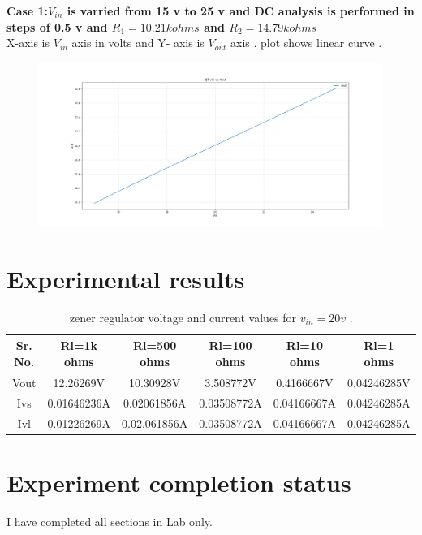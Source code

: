 \documentclass[12pt]{article}
\begin{document}
\textbf{Case 1:\(V_{in}\) is varried from 15 v to 25 v and DC analysis is performed in steps of 0.5 v and \(R_{1}=10.21 k ohms\) and \(R_{2}=14.79 k ohms\) \\}
X-axis is \(V_{in}\) axis in volts and Y- axis is \(V_{out}\) axis . plot shows linear curve .\\
\begin{figure}[h!]
\centering
\includegraphics[scale = 0.3]{BJT_vin_vout.png}
\end{figure}
\newpage

\section{Experimental results}
\begin{table}[!hbt]
		\begin{center}
		\caption{zener regulator voltage and current values for \(v_{in}=20v\) .}
		\begin{tabular}{|c|c|c|c|c|c}
			\hline
			Sr. No. & Rl=1k ohms & Rl=500 ohms & Rl=100 ohms & Rl=10 ohms & Rl=1 ohms\\
			\hline
			Vout & 12.26269V  & 10.30928V & 3.508772V & 0.4166667V & 0.04246285V \\
			\hline
			Ivs & 0.01646236A & 0.02061856A & 0.03508772A & 0.04166667A & 0.04246285A\\
                       \hline
                       Ivl & 0.01226269A  & 0.02.061856A & 0.03508772A & 0.04166667A & 0.04246285A\\
            
		\end{tabular}
		\end{center}
\end{table}

\section{Experiment completion status}
I have completed all sections in Lab only.
\end{document}

